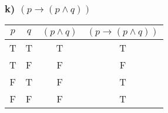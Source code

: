 \documentclass{article}
\begin{document}
\subsubsection{k) $(p \to (p \wedge q))$}
\begin{center}
    \begin{NiceTabular}{|c|c|c|c|}
        \hline
        $p$         & $q$         & $(p \wedge q)$ & $(p \to (p \wedge q))$ \\
        \hline
        \ttfamily T & \ttfamily T & \ttfamily T    & \ttfamily T            \\
        \ttfamily T & \ttfamily F & \ttfamily F    & \ttfamily F            \\
        \ttfamily F & \ttfamily T & \ttfamily F    & \ttfamily T            \\
        \ttfamily F & \ttfamily F & \ttfamily F    & \ttfamily T            \\
        \hline
    \end{NiceTabular}
\end{center}
\end{document}
